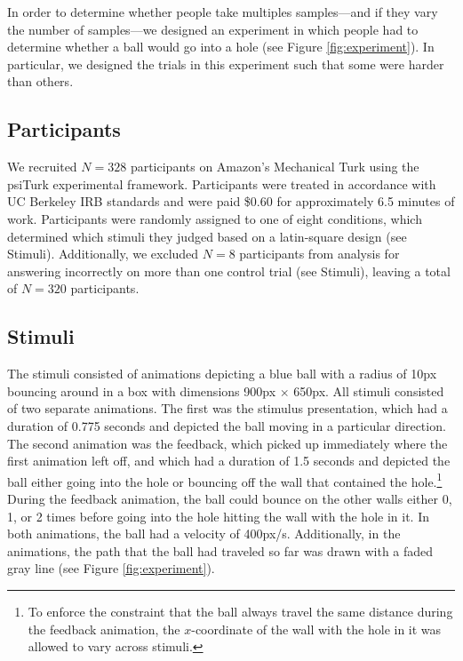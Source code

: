 \documentclass[10pt,letterpaper]{article}
\begin{document}
In order to determine whether people take multiples samples---and if they vary the number of samples---we designed an experiment in which people had to determine whether a ball would go into a hole (see Figure \ref{fig:experiment}). In particular, we designed the trials in this experiment such that some were harder than others.

\subsection{Participants}

We recruited $N=328$ participants on Amazon's Mechanical Turk using the psiTurk \cite{McDonnell12} experimental framework. Participants were treated in accordance with UC Berkeley IRB standards and were paid \$0.60 for approximately 6.5 minutes of work. Participants were randomly assigned to one of eight conditions, which determined which stimuli they judged based on a latin-square design (see Stimuli). Additionally, we excluded $N=8$ participants from analysis for answering incorrectly on more than one control trial (see Stimuli), leaving a total of $N=320$ participants.

\subsection{Stimuli}

The stimuli consisted of animations depicting a blue ball with a radius of 10px bouncing around in a box with dimensions 900px $\times$ 650px. All stimuli consisted of two separate animations. The first was the stimulus presentation, which had a duration of 0.775 seconds and depicted the ball moving in a particular direction. The second animation was the feedback, which picked up immediately where the first animation left off, and which had a duration of 1.5 seconds and depicted the ball either going into the hole or bouncing off the wall that contained the hole.\footnote{To enforce the constraint that the ball always travel the same distance during the feedback animation, the $x$-coordinate of the wall with the hole in it was allowed to vary across stimuli.} During the feedback animation, the ball could bounce on the other walls either 0, 1, or 2 times before going into the hole hitting the wall with the hole in it. In both animations, the ball had a velocity of 400px/s. Additionally, in the animations, the path that the ball had traveled so far was drawn with a faded gray line (see Figure \ref{fig:experiment}).
\end{document}

